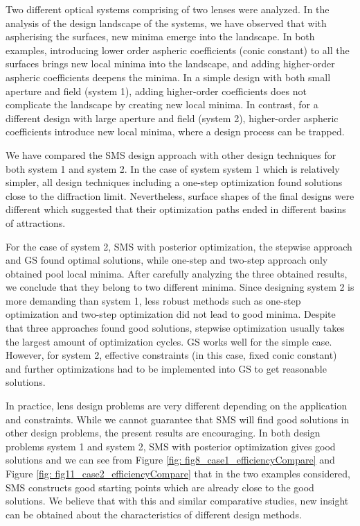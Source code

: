 Two different optical systems comprising of two lenses were analyzed. In the analysis of the design landscape of the systems, we have observed that with aspherising the surfaces, new minima emerge into the landscape. In both examples, introducing lower order aspheric coefficients (conic constant) to all the surfaces brings new local minima into the landscape, and adding higher-order aspheric coefficients deepens the minima. In a simple design with both small aperture and field (system 1), adding higher-order coefficients does not complicate the landscape by creating new local minima. In contrast, for a different design with large aperture and field (system 2), higher-order aspheric coefficients introduce new local minima, where a design process can be trapped.

We have compared the SMS design approach with other design techniques for both system 1 and system 2. In the case of system system 1 which is relatively simpler, all design techniques including a one-step optimization found solutions close to the diffraction limit. Nevertheless, surface shapes of the final designs were different which suggested that their optimization paths ended in different basins of attractions. 

For the case of system 2, SMS with posterior optimization, the stepwise approach and GS found optimal solutions, while one-step and two-step approach only obtained pool local minima. After carefully analyzing the three obtained results, we conclude that they belong to two different minima. Since designing system 2 is more demanding than system 1, less robust methods such as one-step optimization and two-step optimization did not lead to good minima. Despite that three approaches found good solutions, stepwise optimization usually takes the largest amount of optimization cycles. GS works well for the simple case. However, for system 2, effective constraints (in this case, fixed conic constant) and further optimizations had to be implemented into GS to get reasonable solutions. 

In practice, lens design problems are very different depending on the application and constraints. While we cannot guarantee that SMS will find good solutions in other design problems, the present results are encouraging. In both design problems system 1 and system 2, SMS with posterior optimization gives good solutions and we can see from Figure \ref{fig: fig8_case1_efficiencyCompare} and Figure \ref{fig: fig11_case2_efficiencyCompare} that in the two examples considered, SMS constructs good starting points which are already close to the good solutions. We believe that with this and similar comparative studies, new insight can be obtained about the characteristics of different design methods. 



